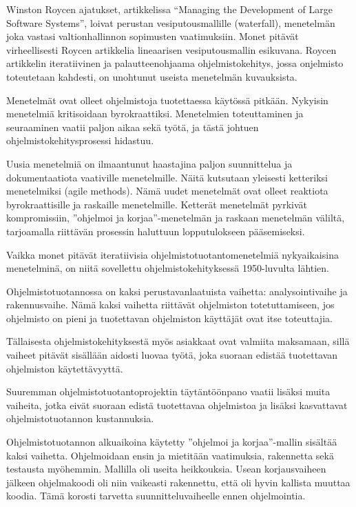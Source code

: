 \documentclass[finnish]{tktltiki2}
\theoremstyle{definition}
\theoremstyle{remark}
\begin{document}
Winston Roycen ajatukset, artikkelissa “Managing the Development of Large Software Systems”, loivat perustan vesiputousmallille (waterfall), menetelmän joka vastasi valtionhallinnon sopimusten vaatimuksiin. Monet pitävät virheellisesti Roycen artikkelia lineaarisen vesiputousmallin esikuvana. Roycen artikkelin iteratiivinen ja palautteenohjaama ohjelmistokehitys, jossa onjelmisto toteutetaan kahdesti, on unohtunut useista menetelmän kuvauksista\cite{LAB03}.

Menetelmät ovat olleet ohjelmistoja tuotettaessa käytössä pitkään. Nykyisin menetelmiä kritisoidaan byrokraattiksi. Menetelmien toteuttaminen ja seuraaminen vaatii paljon aikaa sekä työtä, ja tästä johtuen ohjelmistokehitysprosessi hidastuu\cite{FOM01}.

Uusia menetelmiä on ilmaantunut haastajina paljon suunnittelua ja dokumentaatiota vaativille menetelmille. Näitä kutsutaan yleisesti ketteriksi menetelmiksi (agile methods). Nämä uudet menetelmät ovat olleet reaktiota byrokraattisille ja raskaille menetelmille. Ketterät menetelmät pyrkivät kompromissiin, ''ohjelmoi ja korjaa''-menetelmän ja raskaan menetelmän väliltä, tarjoamalla riittävän prosessin haluttuun lopputulokseen pääsemiseksi\cite{FOM01}.

Vaikka monet pitävät iteratiivisia ohjelmistotuotantomenetelmiä nykyaikaisina menetelminä, on niitä sovellettu ohjelmistokehityksessä 1950-luvulta lähtien\cite{LAB03}. 

Ohjelmistotuotannossa on kaksi perustavanlaatuista vaihetta: analysointivaihe ja rakennusvaihe. Nämä kaksi vaihetta riittävät ohjelmiston totetuttamiseen, jos ohjelmisto on pieni ja tuotettavan ohjelmiston käyttäjät ovat itse toteuttajia\cite{ROY70}. 

Tällaisesta ohjelmistokehityksestä myös asiakkaat ovat valmiita maksamaan, sillä vaiheet pitävät sisällään aidosti luovaa työtä, joka suoraan edistää tuotettavan ohjelmiston käytettävyyttä\cite{ROY70}.

Suuremman ohjelmistotuotantoprojektin täytäntöönpano vaatii lisäksi muita vaiheita, jotka eivät suoraan edistä tuotettavaa ohjelmistoa ja lisäksi kasvattavat ohjelmistotuotannon kustannuksia\cite{ROY70}.

Ohjelmistotuotannon alkuaikoina käytetty ''ohjelmoi ja korjaa''-mallin sisältää kaksi vaihetta. Ohjelmoidaan ensin ja mietitään vaatimuksia, rakennetta sekä testausta myöhemmin. Mallilla oli useita heikkouksia. Usean korjausvaiheen jälkeen ohjelmakoodi oli niin vaikeasti rakennettu, että oli hyvin kallista muuttaa koodia. Tämä korosti tarvetta suunnitteluvaiheelle ennen ohjelmointia\cite{BOE88}.
\end{document}
